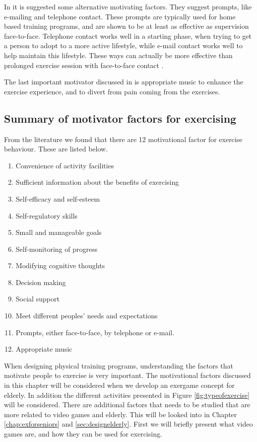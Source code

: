 In \cite{schutzer} it is suggested some alternative motivating factors. They suggest prompts, like e-mailing and telephone contact. These prompts are typically used for home based training programs, and are shown to be at least as effective as supervision face-to-face. Telephone contact works well in a starting phase, when trying to get a person to adopt to a more active lifestyle, while e-mail contact works well to help maintain this lifestyle. These ways can actually be more effective than prolonged exercise session with face-to-face contact \cite{schutzer}. 

The last important motivator discussed in \cite{schutzer} is appropriate music to enhance the exercise experience, and to divert from pain coming from the exercises. 


\subsection{Summary of motivator factors for exercising}

From the literature we found that there are 12 motivational factor for exercise behaviour. These are listed below. 

\begin{enumerate}[{M}.1]
\item Convenience of activity facilities
\item Sufficient information about the benefits of exercising
\item Self-efficacy and self-esteem
\item Self-regulatory skills
\item Small and manageable goals
\item Self-monitoring of progress
\item Modifying cognitive thoughts 
\item Decision making
\item Social support
\item Meet different peoples' needs and expectations
\item Prompts, either face-to-face, by telephone or e-mail. 
\item Appropriate music
\end{enumerate} 

\bigskip


When designing physical training programs, understanding the factors that motivate people to exercise is very important. The motivational factors discussed in this chapter will be considered when we develop an exergame concept for elderly. In addition the different activities presented in Figure \ref{fig:typeofexercise} will be considered. There are additional factors that needs to be studied that are more related to video games and elderly. This will be looked into in Chapter \ref{chap:exforseniors} and \ref{sec:designelderly}. First we will briefly present what video games are, and how they can be used for exercising. 





